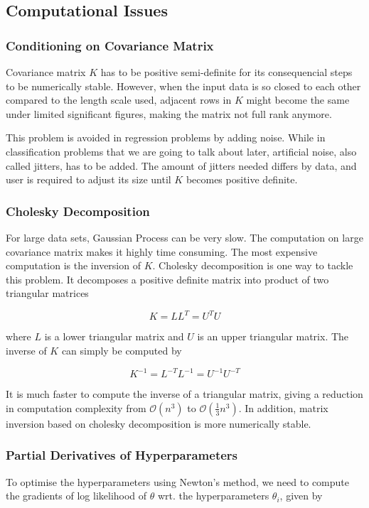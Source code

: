 \documentclass[11pt]{report}
\numberwithin{equation}{chapter}
\begin{document}
\begin{spacing}{2}
\subsection{Computational Issues}

\subsubsection{Conditioning on Covariance Matrix}
Covariance matrix $K$ has to be positive semi-definite for its consequencial steps to be numerically stable. However, when the input data is so closed to each other compared to the length scale used, adjacent rows in $K$ might become the same under limited significant figures, making the matrix not full rank anymore.

This problem is avoided in regression problems by adding noise. While in classification problems that we are going to talk about later, artificial noise, also called jitters, has to be added. The amount of jitters needed differs by data, and user is required to adjust its size until $K$ becomes positive definite.

\subsubsection{Cholesky Decomposition}
For large data sets, Gaussian Process can be very slow. The computation on large covariance matrix makes it highly time consuming. The most expensive computation is the inversion of $K$. Cholesky decomposition is one way to tackle this problem. It decomposes a positive definite matrix into product of two triangular matrices

\begin{equation}
K = LL^T = U^TU
\end{equation}

where $L$ is a lower triangular matrix and $U$ is an upper triangular matrix. The inverse of $K$ can simply be computed by

\begin{equation}
K^{-1} = L^{-T}L^{-1} = U^{-1}U^{-T}
\end{equation}

It is much faster to compute the inverse of a triangular matrix, giving a reduction in computation complexity from $\mathcal{O}(n^3)$ to $\mathcal{O}(\frac{1}{3}n^3)$\cite{marelli2015distributed}. In addition, matrix inversion based on cholesky decomposition is more numerically stable.  


\subsubsection{Partial Derivatives of Hyperparameters}
To optimise the hyperparameters using Newton's method, we need to compute the gradients of log likelihood of $\theta$ wrt. the hyperparameters $\theta_i$, given by 
 

\end{spacing}
\end{document}
